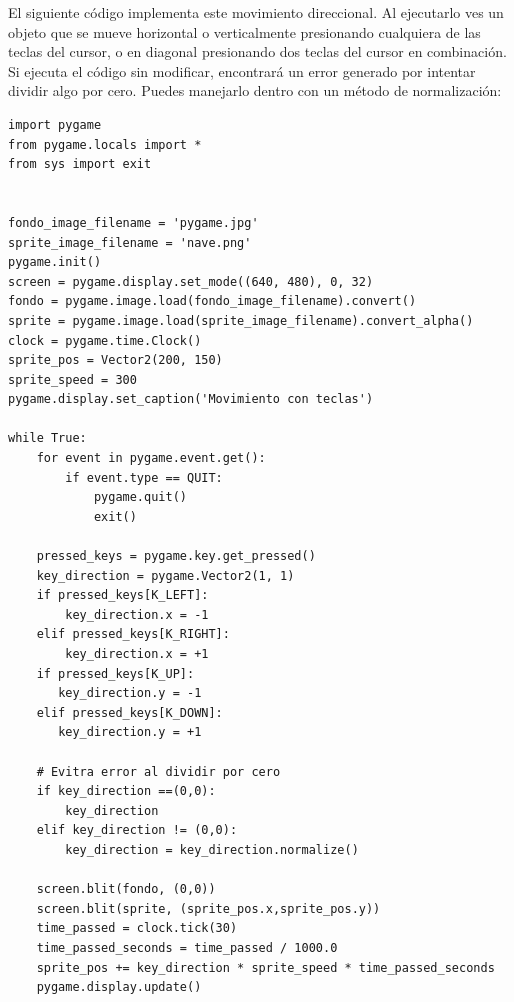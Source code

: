 {El siguiente código implementa este  movimiento direccional. Al ejecutarlo  ves un objeto que se  mueve horizontal o verticalmente presionando cualquiera de las teclas del cursor, o  en diagonal presionando dos teclas del cursor en combinación.
Si ejecuta el código  sin modificar, encontrará un error generado por intentar dividir algo por cero. Puedes manejarlo dentro 
con un método de normalización:




\hspace{-2.5cm}{\ttfamily \scriptsize movimiento\_}

\vspace{-0.2cm}
\hspace{-2.3cm}{\ttfamily \scriptsize teclas.py}\vspace{-0.84cm}
\begin{lstlisting}	
import pygame
from pygame.locals import *
from sys import exit


fondo_image_filename = 'pygame.jpg'
sprite_image_filename = 'nave.png'
pygame.init()
screen = pygame.display.set_mode((640, 480), 0, 32)
fondo = pygame.image.load(fondo_image_filename).convert()
sprite = pygame.image.load(sprite_image_filename).convert_alpha()
clock = pygame.time.Clock()
sprite_pos = Vector2(200, 150)
sprite_speed = 300
pygame.display.set_caption('Movimiento con teclas')

while True:
    for event in pygame.event.get():
        if event.type == QUIT:
            pygame.quit()
            exit()
            
    pressed_keys = pygame.key.get_pressed()
    key_direction = pygame.Vector2(1, 1)
    if pressed_keys[K_LEFT]:
        key_direction.x = -1
    elif pressed_keys[K_RIGHT]:
        key_direction.x = +1
    if pressed_keys[K_UP]:
       key_direction.y = -1
    elif pressed_keys[K_DOWN]:
       key_direction.y = +1
    
    # Evitra error al dividir por cero 
    if key_direction ==(0,0):
        key_direction 
    elif key_direction != (0,0):
        key_direction = key_direction.normalize()
    
    screen.blit(fondo, (0,0))
    screen.blit(sprite, (sprite_pos.x,sprite_pos.y))
    time_passed = clock.tick(30)
    time_passed_seconds = time_passed / 1000.0
    sprite_pos += key_direction * sprite_speed * time_passed_seconds
    pygame.display.update()
\end{lstlisting}





}
